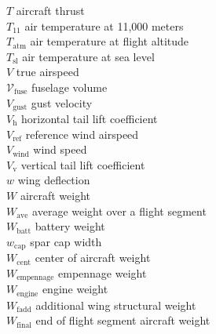 \begin{multicols}{2}
\begin{tabbing}
$T$ \> aircraft thrust \\ %
$T_{11}$ \> air temperature at 11,000 meters \\ %
$T_{\text{atm}}$ \> air temperature at flight altitude \\ %
$T_{\text{sl}}$ \> air temperature at sea level \\ %
$V$ \> true airspeed \\ %
$\mathcal{V}_{\text{fuse}}$ \>  fuselage volume \\ %
$V_{\text{gust}}$ \>  gust velocity \\ %
$V_{\text{h}}$ \> horizontal tail lift coefficient \\
$V_{\text{ref}}$ \>  reference wind airspeed \\ %
$V_{\text{wind}}$ \>  wind speed \\ %
$V_{\text{v}}$ \> vertical tail lift coefficient \\
$w$ \> wing deflection \\ %
$W$ \> aircraft weight \\ %
$W_{\text{ave}}$ \> average weight over a flight segment \\ %
$W_{\text{batt}}$ \> battery weight \\ %
$w_{\text{cap}}$ \> spar cap width \\ %
$W_{\text{cent}}$ \> center of aircraft weight \\ %
$W_{\text{empennage}}$ \> empennage weight \\ %
$W_{\text{engine}}$ \> engine weight \\ %
$W_{\text{fadd}}$ \> additional wing structural weight\\ %
$W_{\text{final}}$ \> end of flight segment aircraft weight \\ %

\end{tabbing}
\end{multicols}

